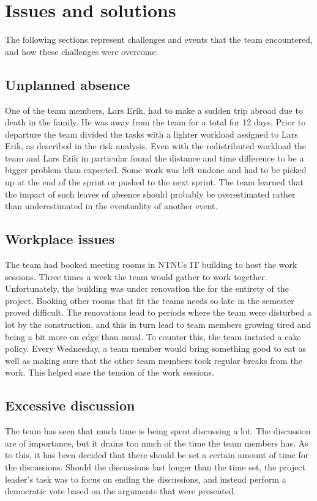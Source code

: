 \section{Issues and solutions}
The following sections represent challenges and events that the team encountered, and how these challenges were overcome.

\subsection{Unplanned absence}
One of the team members, Lars Erik, had to make a sudden trip abroad due to
death in the family. He was away from the team for a total for 12 days. Prior
to departure the team divided the tasks with a lighter workload assigned to Lars
Erik, as described in the risk analysis. Even with the redistributed workload
the team and Lars Erik in particular found the distance and time difference to
be a bigger problem than expected. Some work was left undone and had to be
picked up at the end of the sprint or pushed to the next sprint. The team
learned that the impact of such leaves of absence should probably be
overestimated rather than underestimated in the eventuality of another event.

\subsection{Workplace issues}
The team had booked meeting rooms in NTNUs IT building to host the work sessions. Three times a week the team would gather to work together. Unfortunately, the building was under renovation the for the entirety of the project. Booking other rooms that fit the teams needs so late in the semester proved difficult. The renovations lead to periods where the team were disturbed a lot by the construction, and this in turn lead to team members growing tired and being a bit more on edge than usual. To counter this, the team instated a cake policy. Every Wednesday, a team member would bring something good to eat as well as making sure that the other team members took regular breaks from the work. This helped ease the tension of the work sessions.


\subsection{Excessive discussion}
The team has seen that much time is being spent discussing a lot. The discussion are of importance, but it drains too much of the time the team members has. As to this, it has been decided that there should be set a certain amount of time for the discussions. Should the discussions last longer than the time set, the project leader's task was to focus on ending the discussions, and instead perform a democratic vote based on the arguments that were presented. 

